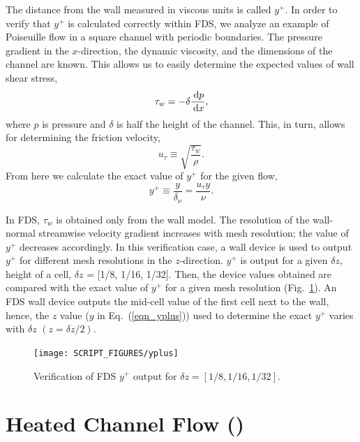 \documentclass[11pt]{book}
\begin{document}
\noindent The distance from the wall measured in viscous units is called $y^+$. In order to verify that $y^+$ is calculated correctly within FDS, we analyze an example of Poiseuille flow in a square channel with periodic boundaries. The pressure gradient in the $x$-direction, the dynamic viscosity, and the dimensions of the channel are known. This allows us to easily determine the expected values of wall shear stress,
\begin{equation}
\label{wall stress}
\tau_w = - \delta \frac{\,\mathrm{d} p}{\,\mathrm{d} x},
\end{equation}
where $p$ is pressure and $\delta$ is half the height of the channel. This, in turn, allows for determining the friction velocity,
\begin{equation}
\label{friction velocity}
u_{\tau} \equiv \sqrt{{\frac{\tau_w}{\rho}}}.
\end{equation}
From here we calculate the exact value of $y^+$ for the given flow,
\begin{equation}
\label{eqn_yplus}
y^+ \equiv \frac{y}{\delta_{\nu}} = \frac{u_{\tau}y}{\nu}.
\end{equation}

In FDS, $\tau_w$ is obtained only from the wall model. The resolution of the wall-normal streamwise velocity gradient increases with  mesh resolution; the value of $y^+$ decreases accordingly. In this verification case, a wall device is used to output $y^+$ for different mesh resolutions in the $z$-direction. $y^+$ is output for a given $\delta z$, height of a cell, $\delta z$ = [1/8, 1/16, 1/32]. Then, the device values obtained are compared with the exact value of $y^+$ for a given mesh resolution (Fig.~\ref{fig_yplus}). An FDS wall device outputs the mid-cell value of the first cell next to the wall, hence, the $z$ value ($y$ in Eq.~(\ref{eqn_yplus})) used to determine the exact $y^+$ varies with $\delta z$ $(z = \delta z/2)$.

\begin{figure}[ht]
\centering
\texttt{[image: SCRIPT\_FIGURES/yplus]}
\caption[Near-wall grid resolution]{Verification of FDS $y^+$ output for $\delta z=[1/8, 1/16, 1/32]$.}
\label{fig_yplus}
\end{figure}


\newpage
\section{Heated Channel Flow (\texorpdfstring{}{heated\_channel})}
\end{document}

